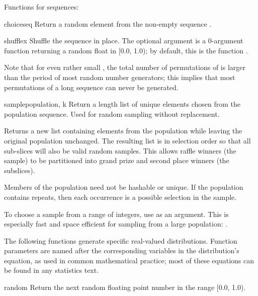 Functions for sequences:

\begin{funcdesc}{choice}{seq}
  Return a random element from the non-empty sequence .
\end{funcdesc}

\begin{funcdesc}{shuffle}{x}
  Shuffle the sequence  in place.
  The optional argument  is a 0-argument function
  returning a random float in [0.0, 1.0); by default, this is the
  function .

  Note that for even rather small , the total
  number of permutations of  is larger than the period of most
  random number generators; this implies that most permutations of a
  long sequence can never be generated.
\end{funcdesc}

\begin{funcdesc}{sample}{population, k}
  Return a  length list of unique elements chosen from the
  population sequence.  Used for random sampling without replacement.

  Returns a new list containing elements from the population while
  leaving the original population unchanged.  The resulting list is
  in selection order so that all sub-slices will also be valid random
  samples.  This allows raffle winners (the sample) to be partitioned
  into grand prize and second place winners (the subslices).

  Members of the population need not be hashable or unique.  If the
  population contains repeats, then each occurrence is a possible
  selection in the sample.

  To choose a sample from a range of integers, use 
  as an argument.  This is especially fast and space efficient for
  sampling from a large population:  .
\end{funcdesc}


The following functions generate specific real-valued distributions.
Function parameters are named after the corresponding variables in the
distribution's equation, as used in common mathematical practice; most of
these equations can be found in any statistics text.

\begin{funcdesc}{random}{}
  Return the next random floating point number in the range [0.0, 1.0).
\end{funcdesc}

